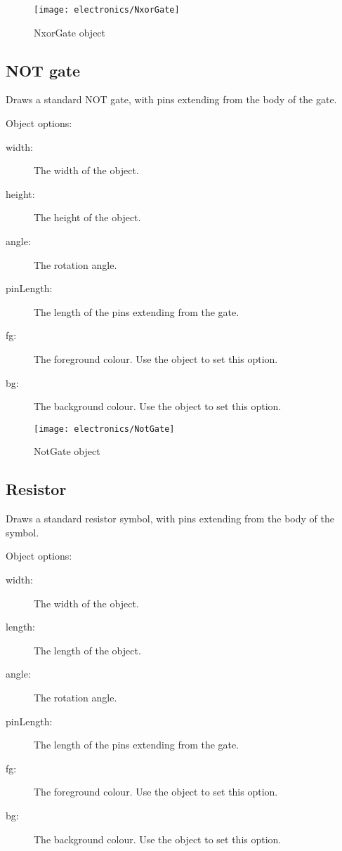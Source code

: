 \begin{figure}[h]
\centerline{\texttt{[image: electronics/NxorGate]}}
\caption{NxorGate object}
\label{fig:Nxor_gate}
\end{figure}

\subsection{NOT gate}
Draws a standard NOT gate, with pins extending from the body of the gate.

Object options:
\begin{description}
\item[width:] The width of the object.
\item[height:] The height of the object.
\item[angle:] The rotation angle.
\item[pinLength:] The length of the pins extending from the gate.
\item[fg:] The foreground colour.  Use the  object to set this
option.
\item[bg:] The background colour.  Use the  object to set this
option.
\end{description}

\begin{figure}[h]
\centerline{\texttt{[image: electronics/NotGate]}}
\caption{NotGate object}
\label{fig:not_gate}
\end{figure}

\subsection{Resistor}
Draws a standard resistor symbol, with pins extending from the body of the
symbol.

Object options:
\begin{description}
\item[width:] The width of the object.
\item[length:] The length of the object.
\item[angle:] The rotation angle.
\item[pinLength:] The length of the pins extending from the gate.
\item[fg:] The foreground colour.  Use the  object to set this
option.
\item[bg:] The background colour.  Use the  object to set this
option.
\end{description}

